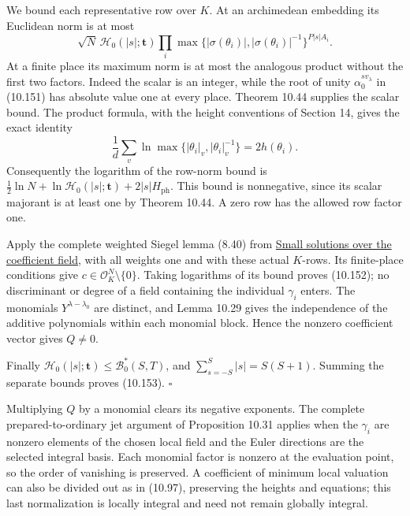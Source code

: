 \documentclass[
  11pt,
  a4paper,
]{article}
\begin{document}
We bound each representative row over \(K\). At an archimedean embedding
its Euclidean norm is at most \[
\sqrt N\,\mathcal H_0(|s|;\boldsymbol t)
\prod_i\max\{|\sigma(\theta_i)|,|\sigma(\theta_i)|^{-1}\}^{P|s|A_i}.
\] At a finite place its maximum norm is at most the analogous product
without the first two factors. Indeed the scalar is an integer, while
the root of unity \(\alpha_0^{s v_\lambda}\) in (10.151) has absolute
value one at every place. Theorem 10.44 supplies the scalar bound. The
product formula, with the height conventions of Section 14, gives the
exact identity \[
\frac1d\sum_v\ln\max\{|\theta_i|_v,|\theta_i|_v^{-1}\}
=2h(\theta_i).
\] Consequently the logarithm of the row-norm bound is
\(\tfrac12\ln N+\ln\mathcal H_0(|s|;\boldsymbol t)+2|s|H_{\mathrm{ph}}\).
This bound is nonnegative, since its scalar majorant is at least one by
Theorem 10.44. A zero row has the allowed row factor one.

Apply the complete weighted Siegel lemma (8.40) from
\href{../TR-BAKER-08.html\#small-solutions-over-the-coefficient-field}{Small
solutions over the coefficient field}, with all weights one and with
these actual \(K\)-rows. Its finite-place conditions give
\(c\in\mathcal O_K^N\setminus\{0\}\). Taking logarithms of its bound
proves (10.152); no discriminant or degree of a field containing the
individual \(\gamma_i\) enters. The monomials \(Y^{\lambda-\lambda_0}\)
are distinct, and Lemma 10.29 gives the independence of the additive
polynomials within each monomial block. Hence the nonzero coefficient
vector gives \(Q\ne0\).

Finally \(\mathcal H_0(|s|;\boldsymbol t)\le\mathcal B_0^*(S,T)\), and
\(\sum_{s=-S}^S|s|=S(S+1)\). Summing the separate bounds proves
(10.153). \(\square\)

Multiplying \(Q\) by a monomial clears its negative exponents. The
complete prepared-to-ordinary jet argument of Proposition 10.31 applies
when the \(\gamma_i\) are nonzero elements of the chosen local field and
the Euler directions are the selected integral basis. Each monomial
factor is nonzero at the evaluation point, so the order of vanishing is
preserved. A coefficient of minimum local valuation can also be divided
out as in (10.97), preserving the heights and equations; this last
normalization is locally integral and need not remain globally integral.
\end{document}
